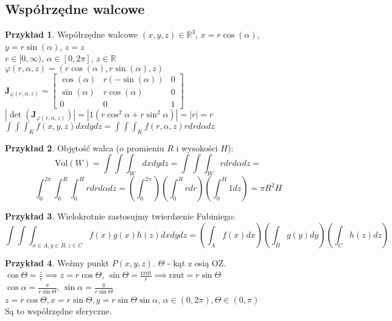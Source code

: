 \documentclass{article}
\theoremstyle{definition}
\theoremstyle{definition}
\theoremstyle{definition}
\newtheorem{pk}{Przykład}[subsection]
\theoremstyle{definition}
\theoremstyle{definition}
\theoremstyle{definition}
\theoremstyle{definition}
\begin{document}
\subsection{Współrzędne walcowe}

\begin{pk}
    Współrzędne walcowe $(x,y,z)\in\mathbb{R}^3$, $x=r\cos(\alpha)$, $y=r\sin(\alpha)$, $z=z$\\
    $r\in[0,\infty)$, $\alpha\in[0,2\pi]$, $z\in\mathbb{R}$\\
    $\varphi(r,\alpha,z) = (r\cos(\alpha),r\sin(\alpha),z)$\\
    $\mathbf{J}_{\varphi(r,\alpha,z)} = \begin{bmatrix}\cos(\alpha)&r(-\sin(\alpha))&0\\\sin(\alpha)&r\cos(\alpha)&0\\0&0&1\end{bmatrix}$\\
    $|\det(\mathbf{J}_{\varphi(r,\alpha,z)})| = |1\left(r\cos^2\alpha + r\sin^2\alpha\right)| = |r| = r$\\
    $\int\int\int_{K} f(x,y,z) dx dy dz = \int\int\int_{K} f(r,\alpha,z) r dr d\alpha dz$
\end{pk}

\begin{pk}
    Objętość walca (o promieniu $R$ i wysokości $H$):
    \[\text{Vol}(W) = \int\int\int_{W} dx dy dz = \int\int\int_{W} r dr d\alpha dz =\] 
    \[\int_{0}^{2\pi} \int_{0}^{R} \int_{0}^{H} r dr d\alpha dz = \left(\int_{0}^{2\pi}\right) \left(\int_{0}^{R} rdr\right) \left(\int_{0}^{H} 1dz\right) = \pi R^2 H\]
\end{pk}

\begin{pk}
    Wielokrotnie zastosujmy twierdzenie Fubiniego:
    \[\int\int\int_{x\in A, y\in B, z\in C} f(x)g(x)h(z) dxdydz = \left(\int_A f(x)dx\right)\left(\int_B g(y) dy\right)\left(\int_C h(z) dz\right)\]
\end{pk}

\begin{pk}
    Weźmy punkt $P(x,y,z)$. $\Theta $ - kąt z osią OZ.\\
    $\cos\Theta = \frac{z}{r} \implies z=r\cos\Theta$,
    $\sin\Theta = \frac{\text{rzut}}{r} \implies \text{rzut} = r\sin\Theta$\\
    $\cos\alpha = \frac{x}{r\sin\Theta}$,
    $\sin\alpha = \frac{y}{r\sin\Theta}$\\
    $z=r\cos\Theta, x=r\sin\Theta, y=r\sin\Theta \sin\alpha$,
    $\alpha\in(0,2\pi), \Theta\in(0,\pi)$\\
    Są to współrzędne sferyczne.    
\end{pk}
\end{document}
